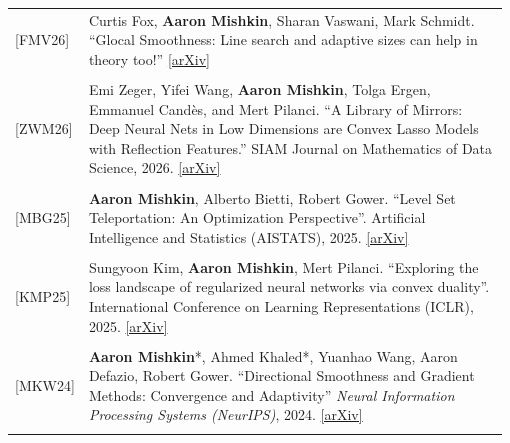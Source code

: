 \documentclass[10pt]{article}
\begin{document}
\begin{longtable}{C{0.1\linewidth} L{0.88\linewidth}}

    [FMV26]                  & Curtis Fox, \textbf{Aaron Mishkin}, Sharan
    Vaswani, Mark Schmidt.  ``Glocal Smoothness: Line search and adaptive sizes
    can help in theory too!'' \href{https://arxiv.org/abs/2506.12648}{[arXiv]}
    \\
    \\

    [ZWM26]       & Emi Zeger, Yifei Wang, \textbf{Aaron Mishkin}, Tolga Ergen, Emmanuel
    Candès, and Mert Pilanci. ``A Library of Mirrors: Deep Neural Nets in Low
    Dimensions are Convex Lasso Models with Reflection Features.''
    SIAM Journal on Mathematics of Data Science, 2026.
    \href{https://arxiv.org/abs/2403.01046}{[arXiv]}
    \\
                                                                                                                                                                            \\

    [MBG25]       & \textbf{Aaron Mishkin}, Alberto Bietti, Robert Gower. ``Level Set
    Teleportation: An Optimization Perspective''. Artificial Intelligence and
    Statistics (AISTATS), 2025. \href{https://arxiv.org/abs/2403.03362}{[arXiv]}
    \\
                                                                                                                                                                            \\

    [KMP25]       & Sungyoon Kim, \textbf{Aaron Mishkin}, Mert Pilanci. ``Exploring the loss
    landscape of regularized neural networks via convex duality''.
    International Conference on Learning Representations (ICLR), 2025.
    \href{https://arxiv.org/abs/2411.07729}{[arXiv]}
    \\
                                                                                                                                                                            \\

    [MKW24]\!\!       & \textbf{Aaron Mishkin}*, Ahmed Khaled*, Yuanhao Wang, Aaron Defazio, Robert
    Gower. ``Directional Smoothness and Gradient Methods: Convergence and
    Adaptivity'' \textit{Neural Information Processing Systems (NeurIPS)},
    2024. \href{https://arxiv.org/abs/2403.04081}{[arXiv]}                                                                                                                                      \\
                                                                                                                                                                            \\


\end{longtable}
\end{document}
